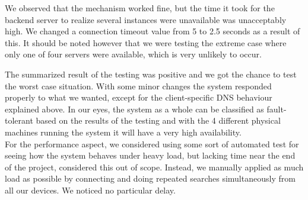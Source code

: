 \begin{itemize}
        We observed that the mechanism worked fine, but the time it took for the
        backend server to realize several instances were unavailable was
        unacceptably high. We changed a connection timeout value from 5 to
        2.5 seconds as a result of this. It should be noted however that we were
        testing the extreme case where only one of four servers were available,
        which is very unlikely to occur.
\end{itemize}


The summarized result of the testing was positive and we got the chance to test
the worst case situation. With some minor changes the system responded properly
to what we wanted, except for the client-specific DNS behaviour explained above.
In our eyes, the system as a whole can be classified as fault-tolerant based on
the results of the testing and with the 4 different physical machines running
the system it will have a very high availability. \\

For the performance aspect, we considered using some sort of automated test for
seeing how the system behaves under heavy load, but lacking time near the end of
the project, considered this out of scope. Instead, we manually applied as much
load as possible by connecting and doing repeated searches simultaneously from
all our devices. We noticed no particular delay.